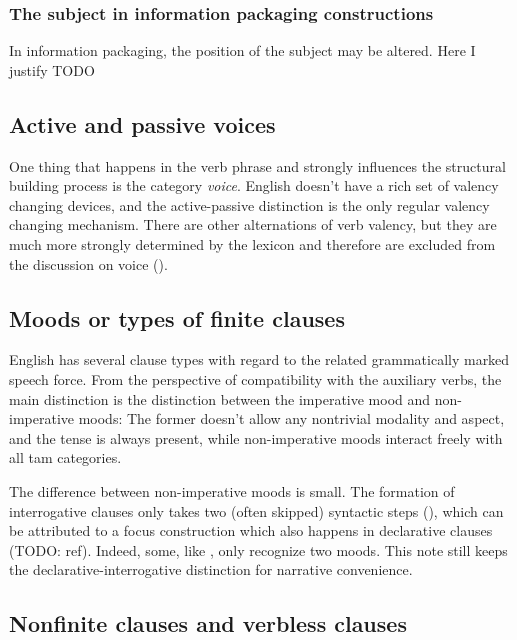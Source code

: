 \documentclass[UTF8, a4paper, oneside, scheme=plain]{ctexrep}
\newcommand*{\citepage}[1]{pp.~{#1}}
\begin{document}
\subsubsection{The subject in information packaging constructions}

In information packaging, the position of the subject may be altered.
Here I justify TODO

\subsection{Active and passive voices}

One thing that happens in the verb phrase 
and strongly influences the structural building process is the category \emph{voice}.
English doesn't have a rich set of valency changing devices,
and the active-passive distinction is the only regular valency changing mechanism.
There are other alternations of verb valency, 
but they are much more strongly determined by the lexicon 
and therefore are excluded from the discussion on voice ().

\subsection{Moods or types of finite clauses}\label{sec:moods}

English has several clause types with regard to the related grammatically marked speech force.
From the perspective of compatibility with the auxiliary verbs,
the main distinction is the distinction between the imperative mood and non-imperative moods:
The former doesn't allow any nontrivial modality and aspect,
and the tense is always present,
while non-imperative moods interact freely with all \acs{tam} categories.

The difference between non-imperative moods is small.
The formation of interrogative clauses 
only takes two (often skipped) syntactic steps 
(),
which can be attributed to a focus construction which also happens in declarative clauses (TODO: ref).
Indeed, some, like \citet[\citepage{25}]{dixon2005semantic}, only recognize two moods.
This note still keeps the declarative-interrogative distinction 
for narrative convenience.

\subsection{Nonfinite clauses and verbless clauses}\label{sec:simple-clause.nonfinite-clause}
\end{document}
